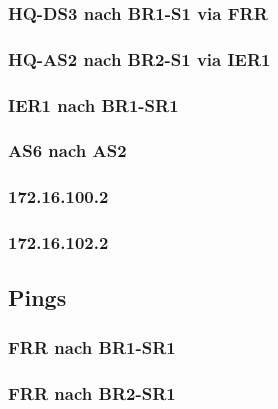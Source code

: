 \subsubsection{HQ-DS3 nach BR1-S1 via FRR}


\subsubsection{HQ-AS2 nach BR2-S1 via IER1}


\subsubsection{IER1 nach BR1-SR1}


\subsubsection{AS6 nach AS2}


\subsubsection{172.16.100.2}


\subsubsection{172.16.102.2}



\subsection{Pings}
\subsubsection{FRR nach BR1-SR1}



\subsubsection{FRR nach BR2-SR1}




